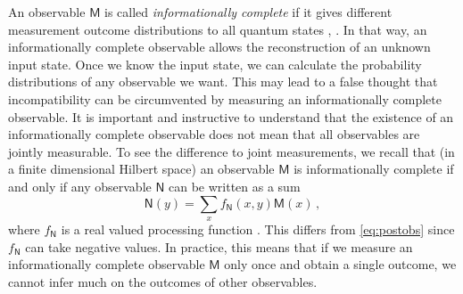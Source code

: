 \documentclass[12pt]{iopart}
\theoremstyle{definition}
\newcommand{\Mo}{\mathsf{M}}%
\newcommand{\No}{\mathsf{N}}%
\begin{document}
An observable $\Mo$ is called \emph{informationally complete} if it gives different measurement outcome distributions to all quantum states \cite{Prugovecki77}, \cite{BuLa89}. 
In that way, an informationally complete observable allows the reconstruction of an unknown input state. 
Once we know the input state, we can calculate the probability distributions of any observable we want.
This may lead to a false thought that incompatibility can be circumvented by measuring an informationally complete observable.
It is important and instructive to understand that the existence of an informationally complete observable does not mean that all observables are jointly measurable.
To see the difference to joint measurements, we recall that (in a finite dimensional Hilbert space) an observable $\Mo$ is informationally complete if and only if any observable $\No$ can be written as a sum
\begin{equation}
\No(y) = \sum_x f_\No(x,y) \Mo(x) \, ,
\end{equation}
where $f_\No$ is a real valued processing function \cite{DaPeSa04}. 
This differs from \eqref{eq:postobs} since $f_\No$ can take negative values.
In practice, this means that if we measure an informationally complete observable $\Mo$ only once and obtain a single outcome, we cannot infer much on the outcomes of other observables.
\end{document}

